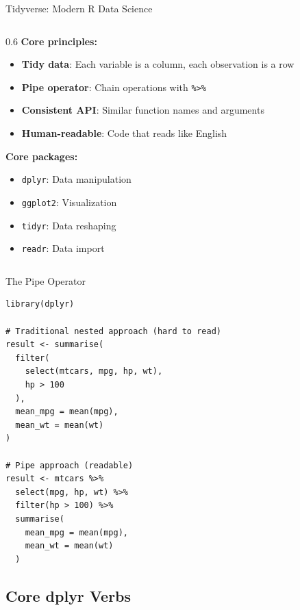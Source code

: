 \documentclass[aspectratio=169]{beamer}
\begin{document}
\begin{frame}{Tidyverse: Modern R Data Science}
  \begin{columns}
    \begin{column}{0.6\textwidth}
      \textbf{Core principles:}
      \begin{itemize}
        \item \textbf{Tidy data}: Each variable is a column, each observation is a row
        \item \textbf{Pipe operator}: Chain operations with \texttt{\%>\%}
        \item \textbf{Consistent API}: Similar function names and arguments
        \item \textbf{Human-readable}: Code that reads like English
      \end{itemize}

      \vspace{1em}
      \textbf{Core packages:}
      \begin{itemize}
        \item \texttt{dplyr}: Data manipulation
        \item \texttt{ggplot2}: Visualization
        \item \texttt{tidyr}: Data reshaping
        \item \texttt{readr}: Data import
      \end{itemize}
    \end{column}
  \end{columns}
\end{frame}

\begin{frame}[fragile]{The Pipe Operator}
\begin{lstlisting}
library(dplyr)

# Traditional nested approach (hard to read)
result <- summarise(
  filter(
    select(mtcars, mpg, hp, wt),
    hp > 100
  ),
  mean_mpg = mean(mpg),
  mean_wt = mean(wt)
)

# Pipe approach (readable)
result <- mtcars %>%
  select(mpg, hp, wt) %>%
  filter(hp > 100) %>%
  summarise(
    mean_mpg = mean(mpg),
    mean_wt = mean(wt)
  )
\end{lstlisting}
\end{frame}

\subsection{Core dplyr Verbs}
\end{document}
